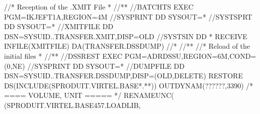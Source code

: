 \documentclass[letterpaper,10pt,english]{sphinxmanual}
\begin{document}
\begin{sphinxVerbatim}[commandchars=\\\{\}]
//\PYGZbs{}* Reception of the .XMIT File \PYGZbs{}*
//\PYGZbs{}*\PYGZhy{}\PYGZhy{}\PYGZhy{}\PYGZhy{}\PYGZhy{}\PYGZhy{}\PYGZhy{}\PYGZhy{}\PYGZhy{}\PYGZhy{}\PYGZhy{}\PYGZhy{}\PYGZhy{}\PYGZhy{}\PYGZhy{}\PYGZhy{}\PYGZhy{}\PYGZhy{}\PYGZhy{}\PYGZhy{}\PYGZhy{}\PYGZhy{}\PYGZhy{}\PYGZhy{}\PYGZhy{}\PYGZhy{}\PYGZhy{}\PYGZhy{}\PYGZhy{}\PYGZhy{}\PYGZhy{}\PYGZhy{}\PYGZhy{}\PYGZhy{}\PYGZhy{}\PYGZhy{}\PYGZhy{}\PYGZhy{}\PYGZhy{}\PYGZhy{}\PYGZhy{}\PYGZhy{}\PYGZhy{}\PYGZhy{}\PYGZhy{}\PYGZhy{}\PYGZhy{}\PYGZhy{}\PYGZhy{}\PYGZhy{}\PYGZhy{}\PYGZhy{}\PYGZhy{}\PYGZhy{}\PYGZhy{}\PYGZhy{}\PYGZhy{}\PYGZhy{}\PYGZhy{}\PYGZhy{}\PYGZhy{}\PYGZhy{}\PYGZhy{}\PYGZhy{}\PYGZhy{}\PYGZhy{}\PYGZhy{}\PYGZbs{}*
//BATCHTS EXEC PGM=IKJEFT1A,REGION=4M
//SYSPRINT DD SYSOUT=\PYGZbs{}*
//SYSTSPRT DD SYSOUT=\PYGZbs{}*
//XMITFILE DD DSN=\PYGZam{}SYSUID..TRANSFER.XMIT,DISP=OLD
//SYSTSIN DD \PYGZbs{}*
RECEIVE INFILE(XMITFILE) DA(TRANSFER.DSSDUMP)
//\PYGZbs{}*
//\PYGZbs{}*\PYGZhy{}\PYGZhy{}\PYGZhy{}\PYGZhy{}\PYGZhy{}\PYGZhy{}\PYGZhy{}\PYGZhy{}\PYGZhy{}\PYGZhy{}\PYGZhy{}\PYGZhy{}\PYGZhy{}\PYGZhy{}\PYGZhy{}\PYGZhy{}\PYGZhy{}\PYGZhy{}\PYGZhy{}\PYGZhy{}\PYGZhy{}\PYGZhy{}\PYGZhy{}\PYGZhy{}\PYGZhy{}\PYGZhy{}\PYGZhy{}\PYGZhy{}\PYGZhy{}\PYGZhy{}\PYGZhy{}\PYGZhy{}\PYGZhy{}\PYGZhy{}\PYGZhy{}\PYGZhy{}\PYGZhy{}\PYGZhy{}\PYGZhy{}\PYGZhy{}\PYGZhy{}\PYGZhy{}\PYGZhy{}\PYGZhy{}\PYGZhy{}\PYGZhy{}\PYGZhy{}\PYGZhy{}\PYGZhy{}\PYGZhy{}\PYGZhy{}\PYGZhy{}\PYGZhy{}\PYGZhy{}\PYGZhy{}\PYGZhy{}\PYGZhy{}\PYGZhy{}\PYGZhy{}\PYGZhy{}\PYGZhy{}\PYGZhy{}\PYGZhy{}\PYGZhy{}\PYGZhy{}\PYGZhy{}\PYGZhy{}\PYGZbs{}*
//\PYGZbs{}* Reload of the initial files \PYGZbs{}*
//\PYGZbs{}*\PYGZhy{}\PYGZhy{}\PYGZhy{}\PYGZhy{}\PYGZhy{}\PYGZhy{}\PYGZhy{}\PYGZhy{}\PYGZhy{}\PYGZhy{}\PYGZhy{}\PYGZhy{}\PYGZhy{}\PYGZhy{}\PYGZhy{}\PYGZhy{}\PYGZhy{}\PYGZhy{}\PYGZhy{}\PYGZhy{}\PYGZhy{}\PYGZhy{}\PYGZhy{}\PYGZhy{}\PYGZhy{}\PYGZhy{}\PYGZhy{}\PYGZhy{}\PYGZhy{}\PYGZhy{}\PYGZhy{}\PYGZhy{}\PYGZhy{}\PYGZhy{}\PYGZhy{}\PYGZhy{}\PYGZhy{}\PYGZhy{}\PYGZhy{}\PYGZhy{}\PYGZhy{}\PYGZhy{}\PYGZhy{}\PYGZhy{}\PYGZhy{}\PYGZhy{}\PYGZhy{}\PYGZhy{}\PYGZhy{}\PYGZhy{}\PYGZhy{}\PYGZhy{}\PYGZhy{}\PYGZhy{}\PYGZhy{}\PYGZhy{}\PYGZhy{}\PYGZhy{}\PYGZhy{}\PYGZhy{}\PYGZhy{}\PYGZhy{}\PYGZhy{}\PYGZhy{}\PYGZhy{}\PYGZhy{}\PYGZhy{}\PYGZbs{}*
//DSSREST EXEC PGM=ADRDSSU,REGION=6M,COND=(0,NE)
//SYSPRINT DD SYSOUT=\PYGZbs{}*
//DUMPFILE DD DSN=\PYGZam{}SYSUID..TRANSFER.DSSDUMP,DISP=(OLD,DELETE)
RESTORE \PYGZhy{}
DS(INCLUDE(SPRODUIT.VIRTEL.BASE\PYGZbs{}*.\PYGZbs{}*\PYGZbs{}*)) \PYGZhy{}
OUTDYNAM(??????,3390) /* \PYGZlt{}==== VOLUME, UNIT ===== */ \PYGZhy{}
RENAMEUNC( \PYGZhy{}
    (SPRODUIT.VIRTEL.BASE457.LOADLIB, \PYGZhy{}

\end{sphinxVerbatim}
\end{document}
